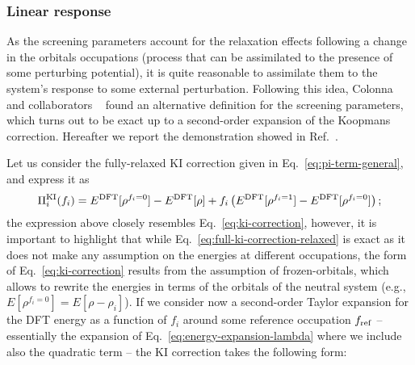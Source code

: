 \subsubsection*{Linear response}
As the screening parameters account for the relaxation effects following a change in the orbitals occupations (process that can be assimilated to the presence of some perturbing potential), it is quite reasonable to assimilate them to the system's response to some external perturbation. Following this idea, Colonna and collaborators ~\cite{colonna_screening_2018} found an alternative definition for the screening parameters, which turns out to be exact up to a second-order expansion of the Koopmans correction. Hereafter we report the demonstration showed in Ref.~\cite{colonna_screening_2018}.

Let us consider the fully-relaxed KI correction given in Eq.~\eqref{eq:pi-term-general}, and express it as
%
\begin{equation}
    \Pi_i^{\rm KI}(f_i) = E^{\rm DFT}[\rho^{f_i=0}] - E^{\rm DFT}[\rho] + f_i \left( E^{\rm DFT}[\rho^{f_i=1}] - E^{\rm DFT}[\rho^{f_i=0}] \right) ;
    \label{eq:full-ki-correction-relaxed}
\end{equation}
%
the expression above closely resembles Eq.~\eqref{eq:ki-correction}, however, it is important to highlight that while Eq.~\eqref{eq:full-ki-correction-relaxed} is exact as it does not make any assumption on the energies at different occupations, the form of Eq.~\eqref{eq:ki-correction} results from the assumption of frozen-orbitals, which allows to rewrite the energies in terms of the orbitals of the neutral system (e.g., $E[\rho^{f_i=0}] = E[\rho-\rho_i]$). If we consider now a second-order Taylor expansion for the DFT energy as a function of $f_i$ around some reference occupation $f_{\rm ref}$ -- essentially the expansion of Eq.~\eqref{eq:energy-expansion-lambda} where we include also the quadratic term -- the KI correction takes the following form:
%
